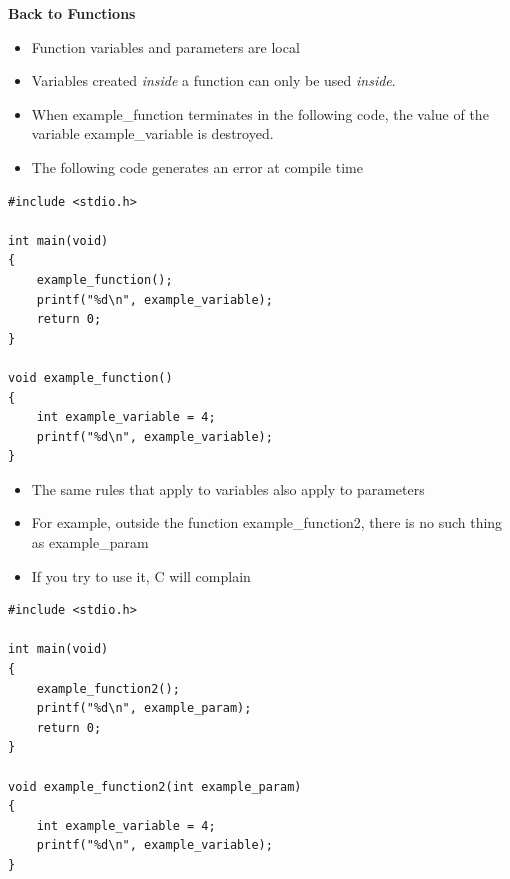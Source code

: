 \documentclass{beamer}
\begin{document}
\begin{frame}[fragile]
\textbf{Back to Functions}
\begin{itemize}
\item Function variables and parameters are local
\item Variables created \textit{inside} a function can only be used \textit{inside}. 
\item When example\_function terminates in the following code, the value of the variable example\_variable is destroyed. 
\item The following code generates an error at compile time
\end{itemize}
\end{frame}

\begin{frame}[fragile]
\begin{block}{}
\begin{lstlisting}
#include <stdio.h>

int main(void) 
{
    example_function();
    printf("%d\n", example_variable);
    return 0;
}

void example_function()
{
    int example_variable = 4;
    printf("%d\n", example_variable);
}
\end{lstlisting}
\end{block}
\end{frame}

\begin{frame}[fragile]
\begin{itemize}
\item The same rules that apply to variables also apply to parameters 
\item For example, outside the function example\_function2, there is no such thing as example\_param 
\item If you try to use it, C will complain 
\end{itemize}
\end{frame}

\begin{frame}[fragile]
\begin{block}{}
\begin{lstlisting}
#include <stdio.h>

int main(void) 
{
    example_function2();
    printf("%d\n", example_param);
    return 0;
}

void example_function2(int example_param)
{
    int example_variable = 4;
    printf("%d\n", example_variable);
}
\end{lstlisting}
\end{block}
\end{frame}
\end{document}
